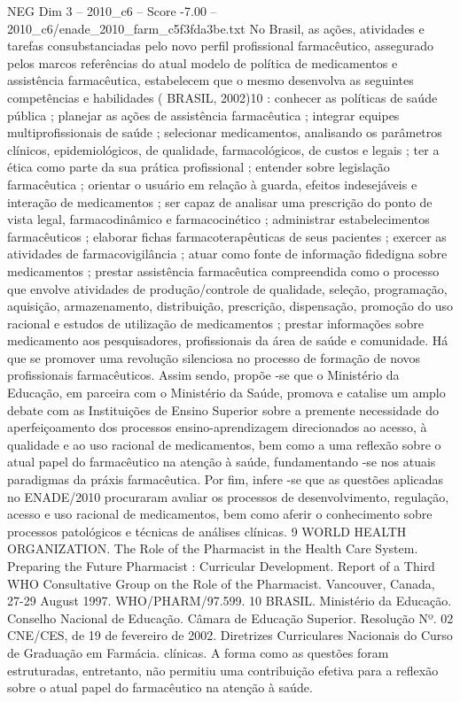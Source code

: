 \begin{textsample}{NEG Dim 3 – 2010\_c6 – Score -7.00 – 2010\_c6/enade\_2010\_farm\_c5f3fda3be.txt}
No Brasil, as ações, atividades e tarefas consubstanciadas pelo novo perfil profissional farmacêutico, assegurado pelos marcos referências do atual modelo de política de medicamentos e assistência farmacêutica, estabelecem que o mesmo desenvolva as seguintes competências e habilidades ( BRASIL, 2002)10 : conhecer as políticas de saúde pública ; planejar as ações de assistência farmacêutica ; integrar equipes multiprofissionais de saúde ; selecionar medicamentos, analisando os parâmetros clínicos, epidemiológicos, de qualidade, farmacológicos, de custos e legais ; ter a ética como parte da sua prática profissional ; entender sobre legislação farmacêutica ; orientar o usuário em relação à guarda, efeitos indesejáveis e interação de medicamentos ; ser capaz de analisar uma prescrição do ponto de vista legal, farmacodinâmico e farmacocinético ; administrar estabelecimentos farmacêuticos ; elaborar fichas farmacoterapêuticas de seus pacientes ; exercer as atividades de farmacovigilância ; atuar como fonte de informação fidedigna sobre medicamentos ; prestar assistência farmacêutica compreendida como o processo que envolve atividades de produção/controle de qualidade, seleção, programação, aquisição, armazenamento, distribuição, prescrição, dispensação, promoção do uso racional e estudos de utilização de medicamentos ; prestar informações sobre medicamento aos pesquisadores, profissionais da área de saúde e comunidade.
Há que se promover uma revolução silenciosa no processo de formação de novos profissionais farmacêuticos.
Assim sendo, propõe -se que o Ministério da Educação, em parceira com o Ministério da Saúde, promova e catalise um amplo debate com as Instituições de Ensino Superior sobre a premente necessidade do aperfeiçoamento dos processos ensino-aprendizagem direcionados ao acesso, à qualidade e ao uso racional de medicamentos, bem como a uma reflexão sobre o atual papel do farmacêutico na atenção à saúde, fundamentando -se nos atuais paradigmas da práxis farmacêutica.
Por fim, infere -se que as questões aplicadas no ENADE/2010 procuraram avaliar os processos de desenvolvimento, regulação, acesso e uso racional de medicamentos, bem como aferir o conhecimento sobre processos patológicos e técnicas de análises clínicas. 9 WORLD HEALTH ORGANIZATION.
The Role of the Pharmacist in the Health Care System.
Preparing the Future Pharmacist : Curricular Development.
Report of a Third WHO Consultative Group on the Role of the Pharmacist.
Vancouver, Canada, 27-29 August 1997.
WHO/PHARM/97.599. 10 BRASIL.
Ministério da Educação.
Conselho Nacional de Educação.
Câmara de Educação Superior.
Resolução Nº. 02 CNE/CES, de 19 de fevereiro de 2002.
Diretrizes Curriculares Nacionais do Curso de Graduação em Farmácia. clínicas.
A forma como as questões foram estruturadas, entretanto, não permitiu uma contribuição efetiva para a reflexão sobre o atual papel do farmacêutico na atenção à saúde.

\end{textsample}
